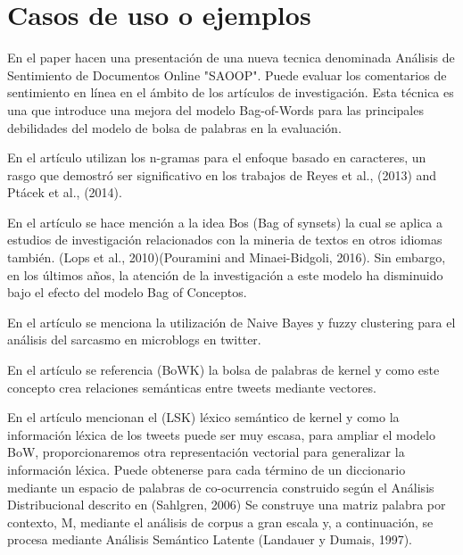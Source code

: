 \documentclass[conference]{IEEEtran}
\begin{document}


%
%

\section{Casos de uso o ejemplos}

En el paper \cite{1} hacen una presentación de una nueva tecnica denominada Análisis de Sentimiento de Documentos Online "SAOOP". 
Puede evaluar los comentarios de sentimiento en línea en el ámbito de los artículos de investigación.
Esta técnica es una que introduce una mejora del modelo Bag-of-Words para las
principales debilidades del modelo de bolsa de palabras en la evaluación.

En el artículo \cite{2}  utilizan los n-gramas para el enfoque basado en caracteres, un rasgo que demostró ser significativo
en los trabajos de Reyes et al., (2013) and Ptácek et al., (2014).

En el artículo \cite{3} se hace mención a la idea Bos (Bag of synsets) la cual se aplica
a estudios de investigación relacionados con la mineria de textos en otros idiomas también.
(Lops et al., 2010)(Pouramini and Minaei-Bidgoli, 2016). Sin embargo, en los
últimos años, la atención de la investigación a este modelo ha disminuido bajo el efecto del modelo Bag of
Conceptos.

En el artículo \cite{4} se menciona la utilización de Naive Bayes y fuzzy clustering para el
análisis del sarcasmo en microblogs en twitter.

En el artículo \cite{5} se referencia (BoWK) la bolsa de palabras de kernel y como este concepto 
crea relaciones semánticas entre tweets mediante vectores.

 En el artículo \cite{6} mencionan el (LSK) léxico semántico de kernel y como la información
 léxica de los tweets puede ser muy escasa, para ampliar el modelo BoW, proporcionaremos
 otra representación vectorial
 para generalizar la información léxica. Puede obtenerse para cada término de un diccionario mediante un
 espacio de palabras de co-ocurrencia construido según el Análisis Distribucional descrito en (Sahlgren, 2006)
 Se construye una matriz palabra por contexto, M, mediante el análisis de corpus a gran escala y, a continuación, se procesa mediante
 Análisis Semántico Latente (Landauer y Dumais, 1997).  
\end{document}
